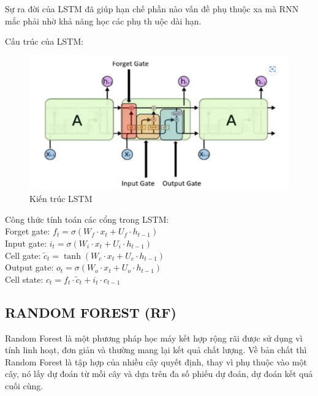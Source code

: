 \documentclass[conference]{IEEEtran}
\begin{document}
Sự ra đời của LSTM đã giúp hạn chế phần nào vấn đề phụ thuộc xa mà RNN mắc phải nhờ khả năng học các phụ th uộc dài hạn.

Cấu trúc của LSTM:
\begin{figure}[H]
    \centering
    \begin{minipage}{0.5\textwidth}
    \centering
    \includegraphics[width=1\textwidth]{Image/LSTM.png}
    \caption{Kiến trúc LSTM}
    \label{fig:1}
    \end{minipage}
\end{figure}
Công thức tính toán các cổng trong LSTM:\\
Forget gate: $f_t = \sigma(W_f \cdot x_t + U_f \cdot h_{t-1})$\\
Input gate: $i_t = \sigma(W_i \cdot x_t + U_i \cdot h_{t-1})$\\
Cell gate: $\tilde{c}_t = \tanh(W_c \cdot x_t + U_c \cdot h_{t-1})$\\
Output gate: $o_t = \sigma(W_o \cdot x_t + U_o \cdot h_{t-1})$\\
Cell state: $c_t = f_t \cdot \tilde{c}_t + i_t \cdot c_{t-1}$
\subsection{RANDOM FOREST (RF)}
Random Forest là một phương pháp học máy kết hợp rộng rãi được sử dụng vì tính linh hoạt, đơn giản và thường mang lại kết quả chất lượng. Về bản chất thì Random Forest là tập hợp của nhiều cây quyết định, thay vì phụ thuộc vào một cây, nó lấy dự đoán từ mỗi cây và dựa trên đa số phiếu dự đoán, dự đoán kết quả cuối cùng.
\end{document}
